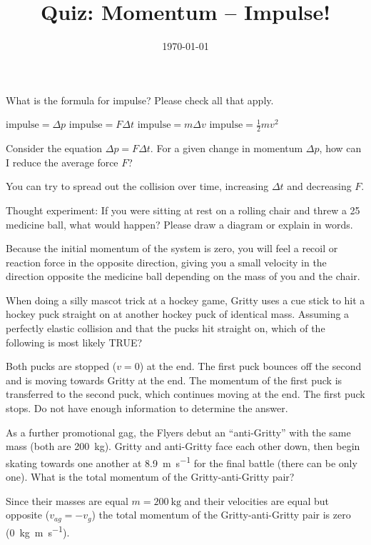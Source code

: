 \documentclass[quiz,addpoints,noanswers]{exam}
\title{Quiz: Momentum -- Impulse!}
\date{\today}
\author{\mobeardInstructorShort}
\begin{document}
\maketitle

\begin{questions}
\question[1] What is the formula for impulse? Please check all that apply. 
\begin{choices}
\CorrectChoice $\text{impulse} = \Delta p$
\CorrectChoice $\text{impulse} = F \Delta t$
\CorrectChoice $\text{impulse} = m \Delta v$
\choice $\text{impulse} = \frac{1}{2} mv^2$
\end{choices}

\question[1] Consider the equation $\Delta p = F \Delta t$. For a given change in momentum $\Delta p$, how can I reduce the average force $F$? 
\begin{solution}[1in]
You can try to spread out the collision over time, increasing $\Delta t$ and decreasing $F$. 
\end{solution}

\question[1] Thought experiment: If you were sitting at rest on a rolling chair and threw a \SI{25}{\pound} medicine ball, what would happen? Please draw a diagram or explain in words. 
\begin{solution}[1in]
Because the initial momentum of the system is zero, you will feel a recoil or reaction force in the opposite direction, giving you a small velocity in the direction opposite the medicine ball depending on the mass of you and the chair. 
\end{solution}

\question[1] When doing a silly mascot trick at a hockey game, Gritty uses a cue stick to hit a hockey puck straight on at another hockey puck of identical mass. Assuming a perfectly elastic collision and that the pucks hit straight on, which of the following is most likely TRUE?
\begin{choices}
\choice Both pucks are stopped ($v=0$) at the end.
\choice The first puck bounces off the second and is moving towards Gritty at the end. 
\CorrectChoice The momentum of the first puck is transferred to the second puck, which continues moving at the end. The first puck stops. 
\choice Do not have enough information to determine the answer. 
\end{choices}

\question[1] As a further promotional gag, the Flyers debut an ``anti-Gritty'' with the same mass (both are \SI{200}{\kilo\gram}).  Gritty and anti-Gritty face each other down, then begin skating towards one another at \SI{8.9}{\meter\per\second} for the final battle (there can be only one).  What is the total momentum of the Gritty-anti-Gritty pair? 
\begin{solution}[1in]
Since their masses are equal $m=\SI{200}{\kilo\gram}$ and their velocities are equal but opposite ($v_{ag} = - v_{g}$) the total momentum of the Gritty-anti-Gritty pair is zero (\SI{0}{\kilo\gram\meter\per\second}). 
\end{solution}
\end{questions}
\end{document}
